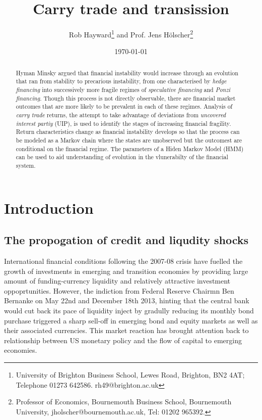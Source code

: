 \documentclass[12pt, a4paper, oneside]{article} %
\begin{document}
\title{Carry trade and transission}
\author{Rob Hayward\footnote{University of Brighton Business School, Lewes Road, Brighton, BN2 4AT; Telephone 01273 642586.  rh49@brighton.ac.uk} and Prof. Jens H\"{o}lscher\footnote{Professor of Economics, Bournemouth Business School, Bournemouth University, jholscher@bournemouth.ac.uk, Tel: 01202 965392.}} 
\date{\today}
\maketitle
\begin{abstract}
Hyman Minsky argued that financial instability would increase through an evolution that ran from stability to precarious instability, from one characterised by \emph{hedge financing} into successively more fragile regimes of \emph{speculative financing} and \emph{Ponzi financing}.  Though this process is not directly observable, there are financial market outcomes that are more likely to be prevalent in each of these regimes.  Analysis of \emph{carry trade} returns, the attempt to take advantage of deviations from \emph{uncovered interest partiy} (UIP), is used to identify the stages of increasing financial fragility.  Return characteristics change as financial instability develops so that the process can be modeled as a Markov chain where the states are unobserved but the outcomest are conditional on  the financial regime.  The parameters of a Hiden Markov Model (HMM) can be used to aid understanding of evolution in the vlunerabilty of the financial system.  %

\end{abstract}

\section{Introduction}
\subsection{The propogation of credit and liqudity shocks}
International financial conditions following the 2007-08 crisis have fuelled the growth of investments in emerging and transition economies by providing large amount of funding-currency liquidity and relatively attractive investment oppoprtunities. However, the indiction from Federal Reserve Chairmn Ben Bernanke on May 22nd and December 18th 2013, hinting that the central bank would cut back its pace of liquidity inject by gradully reducing its monthly bond purchase triggered a sharp sell-off in emerging bond and equity markets as well as their associated currencies.  This market reaction has brought attention back to relationship between US monetary policy and the flow of capital to emerging economies.  
\end{document}
